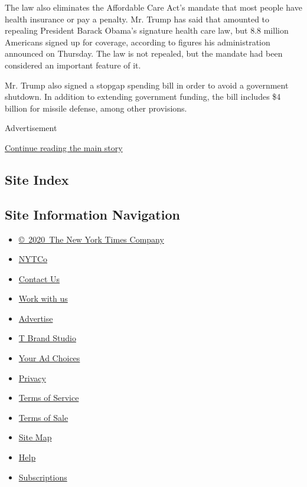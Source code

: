 The law also eliminates the Affordable Care Act's mandate that most
people have health insurance or pay a penalty. Mr. Trump has said that
amounted to repealing President Barack Obama's signature health care
law, but 8.8 million Americans signed up for coverage, according to
figures his administration announced on Thursday. The law is not
repealed, but the mandate had been considered an important feature of
it.

Mr. Trump also signed a stopgap spending bill in order to avoid a
government shutdown. In addition to extending government funding, the
bill includes \$4 billion for missile defense, among other provisions.

Advertisement

\protect\hyperlink{after-bottom}{Continue reading the main story}

\hypertarget{site-index}{%
\subsection{Site Index}\label{site-index}}

\hypertarget{site-information-navigation}{%
\subsection{Site Information
Navigation}\label{site-information-navigation}}

\begin{itemize}
\tightlist
\item
  \href{https://help.nytimes3xbfgragh.onion/hc/en-us/articles/115014792127-Copyright-notice}{©~2020~The
  New York Times Company}
\end{itemize}

\begin{itemize}
\tightlist
\item
  \href{https://www.nytco.com/}{NYTCo}
\item
  \href{https://help.nytimes3xbfgragh.onion/hc/en-us/articles/115015385887-Contact-Us}{Contact
  Us}
\item
  \href{https://www.nytco.com/careers/}{Work with us}
\item
  \href{https://nytmediakit.com/}{Advertise}
\item
  \href{http://www.tbrandstudio.com/}{T Brand Studio}
\item
  \href{https://www.nytimes3xbfgragh.onion/privacy/cookie-policy\#how-do-i-manage-trackers}{Your
  Ad Choices}
\item
  \href{https://www.nytimes3xbfgragh.onion/privacy}{Privacy}
\item
  \href{https://help.nytimes3xbfgragh.onion/hc/en-us/articles/115014893428-Terms-of-service}{Terms
  of Service}
\item
  \href{https://help.nytimes3xbfgragh.onion/hc/en-us/articles/115014893968-Terms-of-sale}{Terms
  of Sale}
\item
  \href{https://spiderbites.nytimes3xbfgragh.onion}{Site Map}
\item
  \href{https://help.nytimes3xbfgragh.onion/hc/en-us}{Help}
\item
  \href{https://www.nytimes3xbfgragh.onion/subscription?campaignId=37WXW}{Subscriptions}
\end{itemize}
